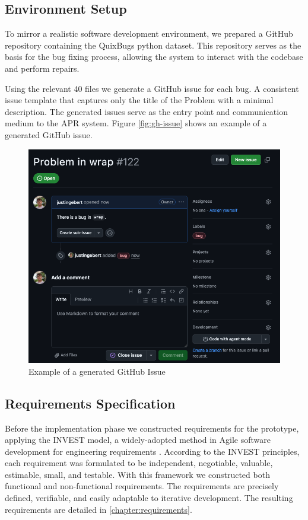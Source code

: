 \subsection{Environment Setup} \label{subsection:environment-setup}
To mirror a realistic software development environment, we prepared a GitHub repository containing the QuixBugs python dataset. This repository serves as the basis for the bug fixing process, allowing the system to interact with the codebase and perform repairs.

Using the relevant 40 files we generate a GitHub issue for each bug. A consistent issue template that captures only the title of the Problem with a minimal description. The generated issues serve as the entry point and communication medium to the APR system. Figure \ref{fig:gh-issue} shows an example of a generated GitHub issue.

\begin{figure}[H]
    \centering
    \includegraphics[width=1\textwidth]{images/github/github_issue.png}
    \caption{Example of a generated GitHub Issue}
    \label{fig:gh-issue2}
\end{figure}

\subsection{Requirements Specification}

Before the implementation phase we constructed requirements for the prototype, applying the INVEST model, a widely-adopted method in Agile software development for engineering requirements \cite{10.5555/984017}. According to the INVEST principles, each requirement was formulated to be independent, negotiable, valuable, estimable, small, and testable. With this framework we constructed both functional and non-functional requirements. The requirements are precisely defined, verifiable, and easily adaptable to iterative development. The resulting requirements are detailed in \ref{chapter:requirements}.

